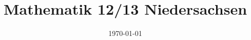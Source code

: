 \documentclass{article}
\begin{document}
\addtocounter{page}{-3}

\title{Mathematik 12/13 Niedersachsen}
\date{\today}
\author{}
\maketitle

\thispagestyle{empty}

\clearpage

\pagestyle{empty}

\tableofcontents

\clearpage

\pagestyle{plain}



\end{document}
